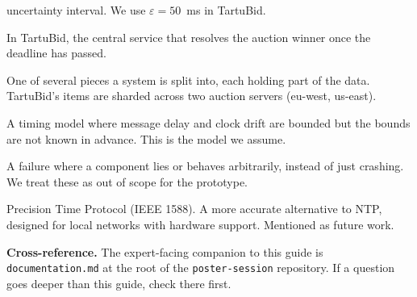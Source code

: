 \documentclass[a4paper,11pt]{article}
\begin{document}
\begin{description}[leftmargin=*,style=nextline]
        uncertainty interval. We use $\varepsilon = 50$~ms in
        TartuBid.
  \item[Coordinator] In TartuBid, the central service that
        resolves the auction winner once the deadline has passed.
  \item[Shard] One of several pieces a system is split into, each
        holding part of the data. TartuBid's items are sharded
        across two auction servers (eu-west, us-east).
  \item[Partially synchronous] A timing model where message delay
        and clock drift are bounded but the bounds are not known
        in advance. This is the model we assume.
  \item[Byzantine failure] A failure where a component lies or
        behaves arbitrarily, instead of just crashing. We treat
        these as out of scope for the prototype.
  \item[PTP] Precision Time Protocol (IEEE 1588). A more accurate
        alternative to NTP, designed for local networks with
        hardware support. Mentioned as future work.
\end{description}

\medskip
\textbf{Cross-reference.} The expert-facing companion to this
guide is \texttt{documentation.md} at the root of the
\texttt{poster-session} repository. If a question goes deeper than
this guide, check there first.
\end{document}

